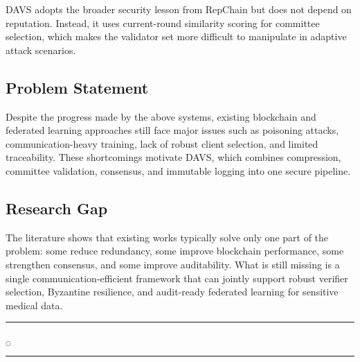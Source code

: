 DAVS adopts the broader security lesson from RepChain but does not depend on reputation. Instead, it uses current-round similarity scoring for committee selection, which makes the validator set more difficult to manipulate in adaptive attack scenarios.

\subsection{Problem Statement}
Despite the progress made by the above systems, existing blockchain and federated learning approaches still face major issues such as poisoning attacks, communication-heavy training, lack of robust client selection, and limited traceability. These shortcomings motivate DAVS, which combines compression, committee validation, consensus, and immutable logging into one secure pipeline.

\subsection{Research Gap}
The literature shows that existing works typically solve only one part of the problem: some reduce redundancy, some improve blockchain performance, some strengthen consensus, and some improve auditability. What is still missing is a single communication-efficient framework that can jointly support robust verifier selection, Byzantine resilience, and audit-ready federated learning for sensitive medical data.

\rule{0.49\textwidth}{0.75pt} $_{\bigcirc}$ \rule{0.49\textwidth}{0.75pt}\\
